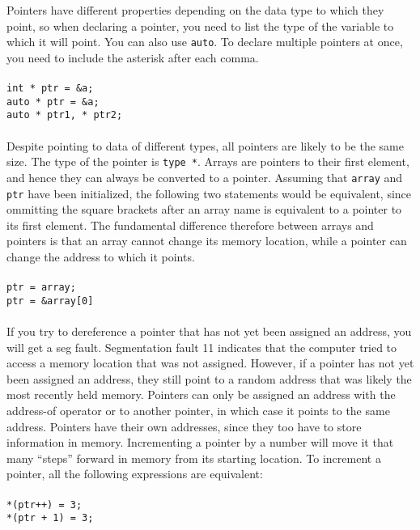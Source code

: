 \documentclass[10pt]{article}
\begin{document}
Pointers have different properties depending on the data type to which they point, so when declaring a pointer, you need to list the type of the variable to which it will point. You can also use \texttt{auto}. To declare multiple pointers at once, you need to include the asterisk after each comma.\\
\\
\color{red}\texttt{int * ptr = \&a;}\color{black}\\
\color{red}\texttt{auto * ptr = \&a;}\color{black}\\
\color{red}\texttt{auto * ptr1, * ptr2;}\color{black}\\
\\
Despite pointing to data of different types, all pointers are likely to be the same size. The type of the pointer is \texttt{type *}. Arrays are pointers to their first element, and hence they can always be converted to a pointer. Assuming that \texttt{array} and \texttt{ptr} have been initialized, the following two statements would be equivalent, since ommitting the square brackets after an array name is equivalent to a pointer to its first element. The fundamental difference therefore between arrays and pointers is that an array cannot change its memory location, while a pointer can change the address to which it points.\\
\\
\color{red}\texttt{ptr = array;}\color{black}\\
\color{red}\texttt{ptr = \&array[0]}\color{black}\\
\\
If you try to dereference a pointer that has not yet been assigned an address, you will get a seg fault. Segmentation fault 11 indicates that the computer tried to access a memory location that was not assigned. However, if a pointer has not yet been assigned an address, they still point to a random address that was likely the most recently held memory. Pointers can only be assigned an address with the address-of operator or to another pointer, in which case it points to the same address. Pointers have their own addresses, since they too have to store information in memory. Incrementing a pointer by a number will move it that many ``steps'' forward in memory from its starting location. To increment a pointer, all the following expressions are equivalent:\\
\\
\color{red}\texttt{*(ptr++) = 3;}\color{black}\\
\color{red}\texttt{*(ptr + 1) = 3;}\color{black}\\
\end{document}
